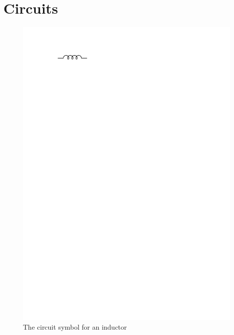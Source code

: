 \documentclass{article}
\begin{document}
    \section{Circuits}
      \begin{figure}[H]
        \centering
        \includegraphics{figures/inductor.pdf}
        \caption{The circuit symbol for an inductor}
      \end{figure}
\end{document}
